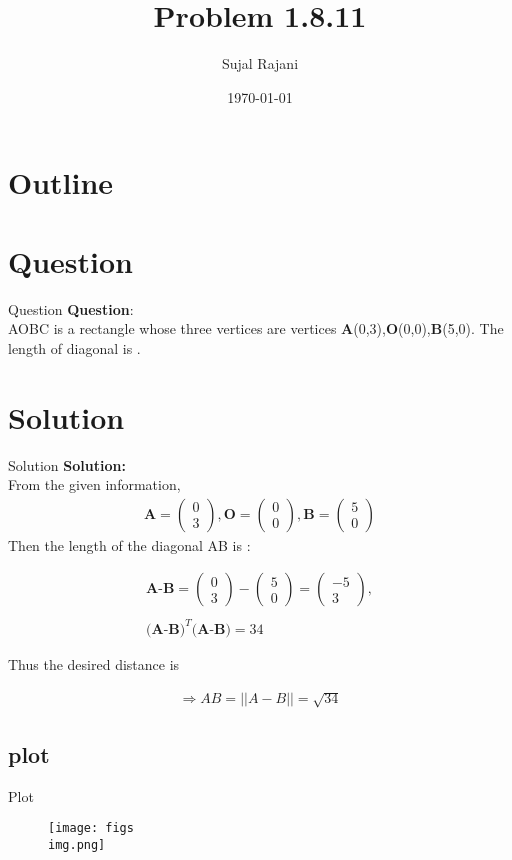 \documentclass{beamer}
\title{Problem 1.8.11}
\author{Sujal Rajani}
\date{\today}
\theoremstyle{remark}
\newcommand{\myvec}[1]{\ensuremath{\begin{pmatrix}#1\end{pmatrix}}}
\numberwithin{equation}{section}
\begin{document}
\begin{frame}
\titlepage
\end{frame}

\section*{Outline}
\begin{frame}
\tableofcontents
\end{frame}
\section{Question}
\begin{frame}{Question}
\textbf{Question}:
\\
\noindent AOBC is a rectangle whose three vertices are vertices \textbf{A}(0,3),\textbf{O}(0,0),\textbf{B}(5,0). The 
length of diagonal is \underline{\hspace{2cm}}.
 
\end{frame}


\section{Solution}
\begin{frame}{Solution}
\textbf{Solution:} 
\\
From the given information,
\begin{align}
		\textbf{A} = \myvec{0\\3},\textbf{O} = \myvec{0\\0},\textbf{B} = \myvec{5\\0} 
\end{align}
Then the length of the diagonal AB is :

\begin{align}
    \textbf{A-B}=\myvec{0\\3}-\myvec{5\\0}=\myvec{-5\\3},
    \\
    \\
    \textbf{(A-B)}^T\textbf{(A-B)}=34
    \end{align}
    
    Thus the desired distance is
    
    \begin{align}
     \Rightarrow AB=||A-B||=\sqrt{34}	 
    \end{align}
    \end{frame}
    \subsection{plot}
       \begin{frame}{Plot}
    \begin{figure}[H]
    \centering
    \texttt{[image: figs\\img.png]}
    \caption*{}
    \label{figs}
\end{figure}
\end{frame}
\end{document}
